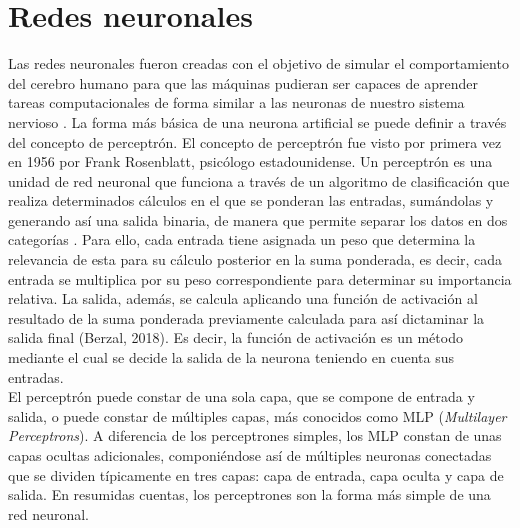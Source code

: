 \section{Redes neuronales}

Las redes neuronales fueron creadas con el objetivo de simular el comportamiento del cerebro humano para que las máquinas pudieran ser capaces de aprender tareas computacionales de forma similar a las neuronas de nuestro sistema nervioso \citep{gonzalez1995redes}. La forma más básica de una neurona artificial se puede definir a través del concepto de perceptrón. El concepto de perceptrón fue visto por primera vez en 1956 por Frank Rosenblatt, psicólogo estadounidense. Un perceptrón es una unidad de red neuronal que funciona a través de un algoritmo de clasificación que realiza determinados cálculos en el que se ponderan las entradas, sumándolas y generando así una salida binaria, de manera que permite separar los datos en dos categorías \citep{rosenblatt1958perceptron}. Para ello, cada entrada tiene asignada un peso que determina la relevancia de esta para su cálculo posterior en la suma ponderada, es decir, cada entrada se multiplica por su peso correspondiente para determinar su importancia relativa. La salida, además, se calcula aplicando una función de activación al resultado de la suma ponderada previamente calculada para así dictaminar la salida final (Berzal, 2018). Es decir, la función de activación es un método mediante el cual se decide la salida de la neurona teniendo en cuenta sus entradas.\\

El perceptrón puede constar de una sola capa, que se compone de entrada y salida, o puede constar de múltiples capas, más conocidos como MLP (\textit{Multilayer Perceptrons}). A diferencia de los perceptrones simples, los MLP constan de unas capas ocultas adicionales, componiéndose así de múltiples neuronas conectadas que se dividen típicamente en tres capas: capa de entrada, capa oculta y capa de salida. En resumidas cuentas, los perceptrones son la forma más simple de una red neuronal.\\

